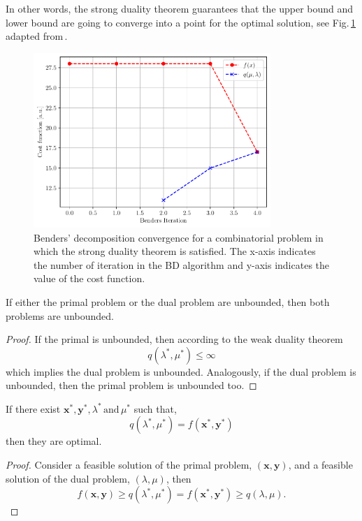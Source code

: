In other words, the strong duality theorem guarantees that the upper bound and lower bound are going to converge into a point for the optimal solution, see Fig.\,\ref{fig:BD_Convergence} adapted from\,\cite{Zhao2021HybridProgramming}.
\begin{figure}[H]
\centering
\includegraphics[width=0.8\textwidth]{Figures/BD_Convergence.pdf} 
\caption{Benders' decomposition convergence for a combinatorial problem in which the strong duality theorem is satisfied. The x-axis indicates the number of iteration in the BD algorithm and y-axis indicates the value of the cost function.}
\label{fig:BD_Convergence}
\end{figure}
\begin{corollary}{}{}
If either the primal problem or the dual problem are unbounded, then both problems are unbounded.
\end{corollary}
\begin{proof}
If the primal is unbounded, then according to the weak duality theorem
\begin{equation}
    q(\lambda^{*}, \mu^{*}) \leq \infty
\end{equation}
which implies the dual problem is unbounded. Analogously, if the dual problem is unbounded, then the primal problem is unbounded too.
\end{proof}
\begin{corollary}{}{}
If there exist $\mathbf{x}^{*}, \mathbf{y}^{*},\lambda^{*}\,\text{and}\, \mu^{*}$ such that,
\begin{equation}
    q(\lambda^{*}, \mu^{*}) = f(\mathbf{x}^{*}, \mathbf{y}^{*})
\end{equation}
then they are optimal.
\end{corollary}
\begin{proof}
Consider a feasible solution of the primal problem, $(\mathbf{x}, \mathbf{y})$, and a feasible solution of the dual problem, $(\lambda, \mu)$, then
\begin{equation}
    f(\mathbf{x}, \mathbf{y}) \geq q(\lambda^{*}, \mu^{*}) = f(\mathbf{x}^{*}, \mathbf{y}^{*}) \geq q(\lambda, \mu).
\end{equation}
\end{proof}
